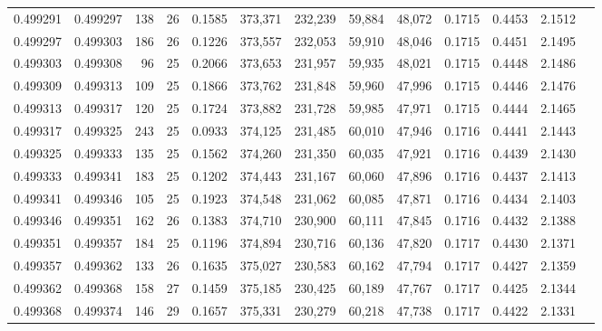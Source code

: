 \begin{tabular}{rrrrrrrrrrrrr}
0.499291 & 0.499297 & 138 &  26 &                                     0.1585 & 373,371 & 232,239 &  59,884 &  48,072 & 0.1715 & 0.4453 & 2.1512 \\
0.499297 & 0.499303 & 186 &  26 &                                     0.1226 & 373,557 & 232,053 &  59,910 &  48,046 & 0.1715 & 0.4451 & 2.1495 \\
0.499303 & 0.499308 &  96 &  25 &                                     0.2066 & 373,653 & 231,957 &  59,935 &  48,021 & 0.1715 & 0.4448 & 2.1486 \\
0.499309 & 0.499313 & 109 &  25 &                                     0.1866 & 373,762 & 231,848 &  59,960 &  47,996 & 0.1715 & 0.4446 & 2.1476 \\
0.499313 & 0.499317 & 120 &  25 &                                     0.1724 & 373,882 & 231,728 &  59,985 &  47,971 & 0.1715 & 0.4444 & 2.1465 \\
0.499317 & 0.499325 & 243 &  25 &                                     0.0933 & 374,125 & 231,485 &  60,010 &  47,946 & 0.1716 & 0.4441 & 2.1443 \\
0.499325 & 0.499333 & 135 &  25 &                                     0.1562 & 374,260 & 231,350 &  60,035 &  47,921 & 0.1716 & 0.4439 & 2.1430 \\
0.499333 & 0.499341 & 183 &  25 &                                     0.1202 & 374,443 & 231,167 &  60,060 &  47,896 & 0.1716 & 0.4437 & 2.1413 \\
0.499341 & 0.499346 & 105 &  25 &                                     0.1923 & 374,548 & 231,062 &  60,085 &  47,871 & 0.1716 & 0.4434 & 2.1403 \\
0.499346 & 0.499351 & 162 &  26 &                                     0.1383 & 374,710 & 230,900 &  60,111 &  47,845 & 0.1716 & 0.4432 & 2.1388 \\
0.499351 & 0.499357 & 184 &  25 &                                     0.1196 & 374,894 & 230,716 &  60,136 &  47,820 & 0.1717 & 0.4430 & 2.1371 \\
0.499357 & 0.499362 & 133 &  26 &                                     0.1635 & 375,027 & 230,583 &  60,162 &  47,794 & 0.1717 & 0.4427 & 2.1359 \\
0.499362 & 0.499368 & 158 &  27 &                                     0.1459 & 375,185 & 230,425 &  60,189 &  47,767 & 0.1717 & 0.4425 & 2.1344 \\
0.499368 & 0.499374 & 146 &  29 &                                     0.1657 & 375,331 & 230,279 &  60,218 &  47,738 & 0.1717 & 0.4422 & 2.1331 \\

\end{tabular}
